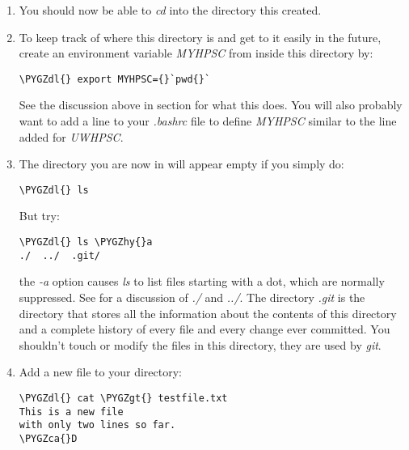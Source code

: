 \documentclass[letterpaper,10pt,english]{sphinxmanual}
\def\PYGZca{\char`\^}
\def\PYGZgt{\char`\>}
\def\PYGZdl{\char`\$}
\def\PYGZhy{\char`\-}
\begin{document}
\begin{enumerate}
\item {} 
You should now be able to \emph{cd} into the directory this created.

\item {} 
To keep track of where this directory is and get to it easily in the
future, create an environment variable \emph{MYHPSC} from inside this directory
by:

\begin{Verbatim}[commandchars=\\\{\}]
\PYGZdl{} export MYHPSC={}`pwd{}`
\end{Verbatim}

See the discussion above in section {\hyperref[git:classgit]{}} for what this does.  You
will also probably want to add a line to your \emph{.bashrc} file to define
\emph{MYHPSC} similar to the line added for \emph{UWHPSC}.

\item {} 
The directory you are now in will appear empty if you simply do:

\begin{Verbatim}[commandchars=\\\{\}]
\PYGZdl{} ls
\end{Verbatim}

But try:

\begin{Verbatim}[commandchars=\\\{\}]
\PYGZdl{} ls \PYGZhy{}a
./  ../  .git/
\end{Verbatim}

the \emph{-a} option causes \emph{ls} to list files starting with a dot, which are
normally suppressed.  See  for a discussion of \emph{./} and \emph{../}.
The directory \emph{.git} is the directory that stores all the information
about the contents of this directory and a complete history of every file
and every change ever committed.  You shouldn't touch or modify the files in
this directory, they are used by \emph{git}.

\item {} 
Add a new file to your directory:

\begin{Verbatim}[commandchars=\\\{\}]
\PYGZdl{} cat \PYGZgt{} testfile.txt
This is a new file
with only two lines so far.
\PYGZca{}D
\end{Verbatim}


\end{enumerate}
\end{document}
